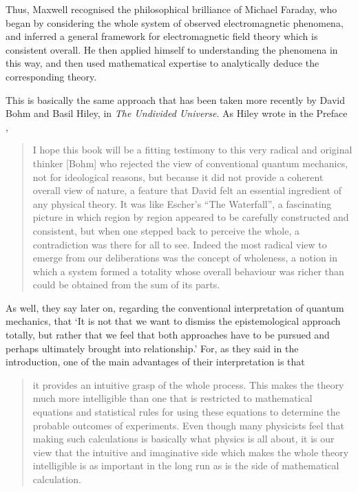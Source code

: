 Thus, Maxwell recognised the philosophical brilliance of Michael Faraday, who began by considering the whole system of observed electromagnetic phenomena, and inferred a general framework for electromagnetic field theory which is consistent overall. He then applied himself to understanding the phenomena in this way, and then used mathematical expertise to analytically deduce the corresponding theory.

This is basically the same approach that has been taken more recently by David Bohm and Basil Hiley, in \textit{The Undivided Universe}. As Hiley wrote in the Preface \cite{Bohm1993},
\begin{quote}
I hope this book will be a fitting testimony to this very radical and original thinker [Bohm] who rejected the view of conventional quantum mechanics, not for ideological reasons, but because it did not provide a coherent overall view of nature, a feature that David felt an essential ingredient of any physical theory. It was like Escher's ``The Waterfall'', a fascinating picture in which region by region appeared to be carefully constructed and consistent, but when one stepped back to perceive the whole, a contradiction was there for all to see. Indeed the most radical view to emerge from our deliberations was the concept of wholeness, a notion in which a system formed a totality whose overall behaviour was richer than could be obtained from the sum of its parts.
\end{quote}
As well, they say later on, regarding the conventional interpretation of quantum mechanics, that `It is not that we want to dismiss the epistemological approach totally, but rather that we feel that both approaches have to be pursued and perhaps ultimately brought into relationship.' For, as they said in the introduction, one of the main advantages of their interpretation is that
\begin{quote}
it provides an intuitive grasp of the whole process. This makes the theory much more intelligible than one that is restricted to mathematical equations and statistical rules for using these equations to determine the probable outcomes of experiments. Even though many physicists feel that making such calculations is basically what physics is all about, it is our view that the intuitive and imaginative side which makes the whole theory intelligible is as important in the long run as is the side of mathematical calculation.
\end{quote}

